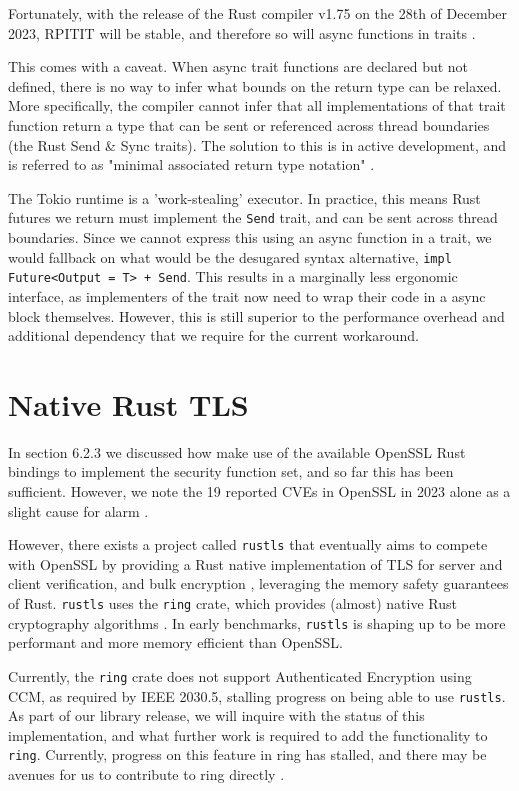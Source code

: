 Fortunately, with the release of the Rust compiler v1.75 on the 28th of December 2023, RPITIT will be stable, and therefore so will async functions in traits \cite{rust175}. 

This comes with a caveat. When async trait functions are declared but not defined, there is no way to infer what bounds on the return type can be relaxed. More specifically, the compiler cannot infer that all implementations of that trait function return a type that can be sent or referenced across thread boundaries (the Rust Send \& Sync traits). The solution to this is in active development, and is referred to as "minimal associated return type notation" \cite{sendboundproblem}.

The Tokio runtime is a 'work-stealing' executor. In practice, this means Rust futures we return must implement the \texttt{Send} trait, and can be sent across thread boundaries. Since we cannot express this using an async function in a trait, we would fallback on what would be the desugared syntax alternative, \texttt{impl Future<Output = T> + Send}. This results in a marginally less ergonomic interface, as implementers of the trait now need to wrap their code in a async block themselves. However, this is still superior to the performance overhead and additional dependency that we require for the current workaround.

\section{Native Rust TLS}
In section 6.2.3 we discussed how make use of the available OpenSSL Rust bindings to implement the security function set, and so far this has been sufficient. However, we note the 19 reported CVEs in OpenSSL in 2023 alone as a slight cause for alarm \cite{OpensslCVE}. 

However, there exists a project called \texttt{rustls} that eventually aims to compete with OpenSSL by providing a Rust native implementation of TLS for server and client verification, and bulk encryption \cite{rustls}, leveraging the memory safety guarantees of Rust. \texttt{rustls} uses the \texttt{ring} crate, which provides (almost) native Rust cryptography algorithms \cite{ring}. 
In early benchmarks, \texttt{rustls} is shaping up to be more performant and more memory efficient than OpenSSL. \cite{rustlsperf}

Currently, the \texttt{ring} crate does not support Authenticated Encryption using CCM, as required by IEEE 2030.5, stalling progress on being able to use \texttt{rustls}. As part of our library release, we will inquire with the status of this implementation, and what further work is required to add the functionality to \texttt{ring}. Currently, progress on this feature in ring has stalled, and there may be avenues for us to contribute to ring directly \cite{ringccmpr} \cite{ringccmissue}.

